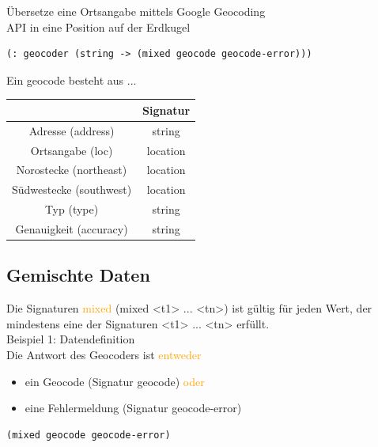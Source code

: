 \documentclass[paper=a4, fontsize=11pt]{scrartcl}
\numberwithin{equation}{section}
\numberwithin{figure}{section}
\numberwithin{table}{section}
\begin{document}
Übersetze eine Ortsangabe mittels Google Geocoding \\
API in eine Position auf der Erdkugel 
\begin{lstlisting}
(: geocoder (string -> (mixed geocode geocode-error)))
\end{lstlisting}
Ein geocode besteht aus ... \\
\begin{tabular}{|c|c|}
\hline
 & Signatur \\\hline
Adresse (address) & string \\
Ortsangabe (loc) & location \\
Norostecke (northeast) & location \\
Südwestecke (southwest) & location \\
Typ (type) & string \\
Genauigkeit (accuracy) & string \\\hline 
\end{tabular}
\subsection{Gemischte Daten}
Die Signaturen \textcolor{orange}{mixed} (mixed <t1> ... <tn>) ist gültig für jeden Wert, der mindestens eine der Signaturen <t1> ... <tn> erfüllt. \\
Beispiel 1: Datendefinition \\
Die Antwort des Geocoders ist \textcolor{orange}{entweder} \\
\begin{itemize}
\item ein Geocode (Signatur geocode) \textcolor{orange}{oder} 
\item eine Fehlermeldung (Signatur geocode-error)
\end{itemize}
\begin{lstlisting}
(mixed geocode geocode-error)
\end{lstlisting}
\end{document}

